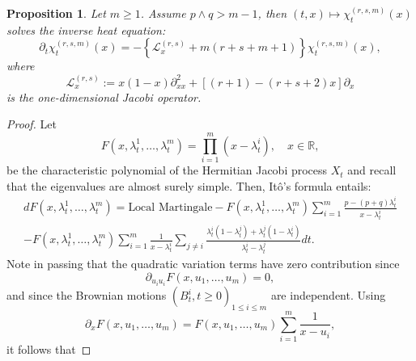 \documentclass[12pt,reqno]{amsart}
\newtheorem{proposition}{Proposition}
\begin{document}
\begin{proposition}
	\label{prop:heatequationjacobi}
	Let $m\geq 1$. Assume $p \wedge q > m-1$, then $(t,x) \mapsto \chi_t^{(r,s,m)}(x)$ solves the inverse heat equation:
	\begin{equation*}
		\partial_t\chi_t^{(r,s,m)}(x) = -\left\{\mathcal{L}_x^{(r,s)} + m(r+s+m+1) \right\}
		\chi_t^{(r,s,m)}(x),
	\end{equation*}
	where
	\begin{equation*}
		\mathcal{L}_x^{(r,s)} := x(1-x)\partial_{xx}^2 + [(r+1) - (r+s+2)x]\partial_x
	\end{equation*}
	is the one-dimensional Jacobi operator.
\end{proposition}
\begin{proof}
	Let
	\begin{equation*}
		F(x,\lambda_t^1, \dots, \lambda_t^m) =
		\prod_{i=1}^m(x-\lambda_t^i), \quad x \in \mathbb{R},
	\end{equation*}
	be the characteristic polynomial of the Hermitian Jacobi process $X_t$ and recall that the eigenvalues are almost surely simple. Then, It\^o's formula entails:
	\begin{multline*}
		dF(x, \lambda_t^1, \dots, \lambda_t^m) = \textrm{Local Martingale}
		-F(x, \lambda_t^1, \dots, \lambda_t^m)\sum_{i=1}^m\frac{p-(p+q)\lambda_t^i}{x-\lambda_t^i}
		\\-F(x, \lambda_t^1, \dots, \lambda_t^m)\sum_{i=1}^m\frac{1}{x-\lambda_t^i}
		\sum_{j\neq i}\frac{\lambda_t^i(1-\lambda_t^j) + \lambda_t^j(1-\lambda_t^i)}{\lambda_t^i-\lambda_t^j} dt.
	\end{multline*}
	Note in passing that the quadratic variation terms have zero contribution since
	\begin{equation*}
		\partial_{u_iu_i}F(x, u_1, \dots, u_m) = 0,
	\end{equation*}
	and since the Brownian motions $(B_t^i, t \geq 0)_{1 \leq i \leq m}$ are independent.
	Using
	\begin{equation*}
		\partial_xF(x, u_1, \dots, u_m) = F(x, u_1, \dots, u_m)\sum_{i=1}^m \frac{1}{x-u_i},
	\end{equation*}
	it follows that


\end{proof}
\end{document}
